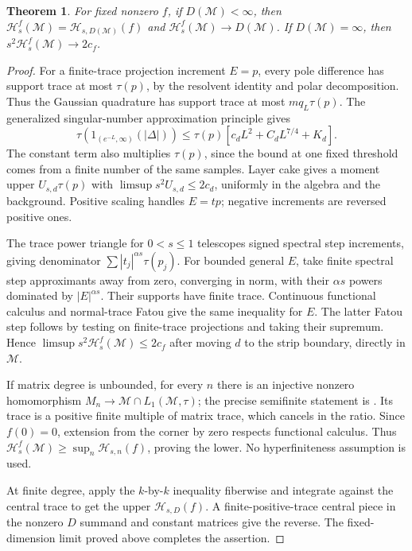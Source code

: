 \documentclass[11pt]{article}
\newtheorem{theorem}{Theorem}[section]
\numberwithin{equation}{section}
\newcommand{\cH}{\mathcal H}
\begin{document}
\begin{theorem}\label{thm:algebra}
For fixed nonzero $f$, if $D(\mathcal M)<\infty$, then
$\cH_s^f(\mathcal M)=\cH_{s,D(\mathcal M)}(f)$ and
$\cH_s^f(\mathcal M)\to D(\mathcal M)$. If $D(\mathcal M)=\infty$,
then $s^2\cH_s^f(\mathcal M)\to2c_f$.
\end{theorem}
\begin{proof}
For a finite-trace projection increment $E=p$, every pole difference
has support trace at most $\tau(p)$, by the resolvent identity and
polar decomposition. Thus the Gaussian quadrature has support trace
at most $m q_L\tau(p)$. The generalized singular-number approximation
principle \cite[Proposition 2.4]{FK} gives
\[
 \tau(1_{(e^{-L},\infty)}(|\Delta|))
 \le\tau(p)[c_d L^2+C_dL^{7/4}+K_d].
\]
The constant term also multiplies $\tau(p)$, since the bound at one
fixed threshold comes from a finite number of the same samples.
Layer cake gives a moment upper $U_{s,d}\tau(p)$ with
$\limsup s^2U_{s,d}\le2c_d$, uniformly in the algebra and the
background. Positive scaling handles $E=t p$; negative increments
are reversed positive ones.

The trace power triangle for $0<s\le1$
\cite[Proposition 4.6(i)]{FK} telescopes signed spectral step increments,
giving denominator $\sum |t_j|^{\alpha s}\tau(p_j)$.
For bounded general $E$, take finite spectral step approximants away
from zero, converging in norm, with their $\alpha s$ powers dominated
by $|E|^{\alpha s}$. Their supports have finite trace. Continuous
functional calculus and normal-trace Fatou give the same inequality
for $E$. The latter Fatou step follows by testing on finite-trace
projections and taking their supremum. Hence
$\limsup s^2\cH_s^f(\mathcal M)\le2c_f$ after moving $d$ to the
strip boundary, directly in $\mathcal M$.

If matrix degree is unbounded, for every $n$ there is an injective
nonzero homomorphism $M_n\to\mathcal M\cap L_1(\mathcal M,\tau)$;
the precise semifinite statement is \cite[Proposition 3.32]{Arhancet}.
Its trace is a positive finite multiple of matrix trace, which cancels
in the ratio. Since $f(0)=0$, extension from the corner by zero respects
functional calculus. Thus
$\cH_s^f(\mathcal M)\ge\sup_n\cH_{s,n}(f)$, proving the lower.
No hyperfiniteness assumption is used.

At finite degree, apply the $k$-by-$k$ inequality fiberwise and
integrate against the central trace to get the upper
$\cH_{s,D}(f)$. A finite-positive-trace central piece in the nonzero
$D$ summand and constant matrices give the reverse. The fixed-dimension
limit proved above completes the assertion.
\end{proof}
\end{document}
